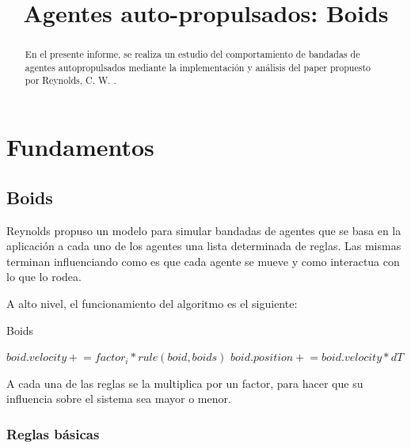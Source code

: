 \documentclass[a4paper]{article}
\title{{\centering\huge {Agentes auto-propulsados: Boids}}}
\begin{document}
\begin{titlingpage}
    \maketitle
    \begin{abstract}
        En el presente informe, se realiza un estudio del comportamiento de bandadas de agentes autopropulsados mediante la implementación y análisis del paper propuesto por Reynolds, C. W. \cite{BoidsPaper}.
    \end{abstract}
\end{titlingpage}

    \tableofcontents
    \newpage

    \section{Fundamentos}
        \subsection{Boids}
            Reynolds propuso un modelo para simular bandadas de agentes que se basa en la aplicación a cada uno de los agentes una lista determinada de reglas. Las mismas terminan influenciando como es que cada agente se mueve y como interactua con lo que lo rodea.


            A alto nivel, el funcionamiento del algoritmo es el siguiente:

            \begin{algorithm}
                \caption{Boids}\label{pseudo:boids}
                \begin{algorithmic}[1]
                            \State $boid.velocity \mathrel{+}= factor_i * rule(boid, boids)$
                        \EndFor
                        \State $boid.position \mathrel{+}= boid.velocity * dT$
                    \EndFor
                \EndProcedure
                \end{algorithmic}
            \end{algorithm}

            A cada una de las reglas se la multiplica por un factor, para hacer que su influencia sobre el sistema sea mayor o menor.

            \subsubsection{Reglas básicas}
\end{document}
